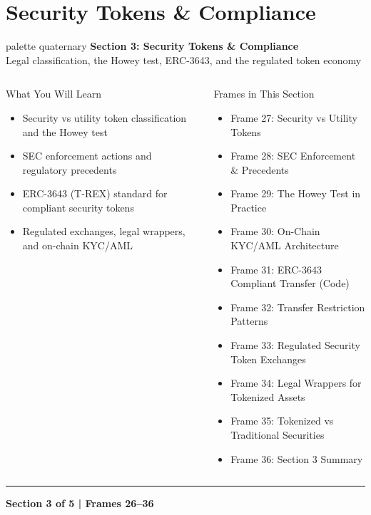 \documentclass[8pt,aspectratio=169]{beamer}
\newcommand{\bottomnote}[1]{\vfill\vspace{-2mm}\textcolor{mllavender2}{\rule{\textwidth}{0.4pt}}\vspace{1mm}\footnotesize\textbf{#1}}
\begin{document}
\section{Security Tokens \& Compliance}

\begin{frame}{}
\begin{beamercolorbox}[sep=12pt,center,rounded=true,shadow=true]{palette quaternary}
  {\Large\bfseries Section 3: Security Tokens \& Compliance}\\[6pt]
  {\normalsize Legal classification, the Howey test, ERC-3643, and the regulated token economy}
\end{beamercolorbox}
\vspace{4mm}
\begin{columns}[T]
\begin{block}{What You Will Learn}
\footnotesize
\begin{itemize}
  \item Security vs utility token classification and the Howey test
  \item SEC enforcement actions and regulatory precedents
  \item ERC-3643 (T-REX) standard for compliant security tokens
  \item Regulated exchanges, legal wrappers, and on-chain KYC/AML
\end{itemize}
\end{block}
\begin{block}{Frames in This Section}
\footnotesize
\begin{itemize}
  \item Frame 27: Security vs Utility Tokens
  \item Frame 28: SEC Enforcement \& Precedents
  \item Frame 29: The Howey Test in Practice
  \item Frame 30: On-Chain KYC/AML Architecture
  \item Frame 31: ERC-3643 Compliant Transfer (Code)
  \item Frame 32: Transfer Restriction Patterns
  \item Frame 33: Regulated Security Token Exchanges
  \item Frame 34: Legal Wrappers for Tokenized Assets
  \item Frame 35: Tokenized vs Traditional Securities
  \item Frame 36: Section 3 Summary
\end{itemize}
\end{block}
\end{columns}
\bottomnote{Section 3 of 5 | Frames 26--36}
\end{frame}
\end{document}
